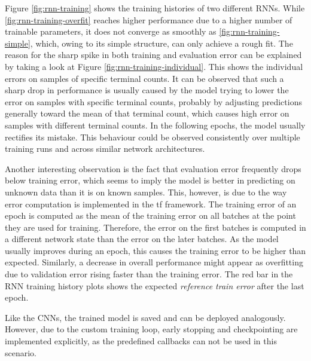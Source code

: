 Figure \ref{fig:rnn-training} shows the training histories of two different \glspl{RNN}. While \ref{fig:rnn-training-overfit} reaches higher performance due to a higher number of trainable parameters, it does not converge as smoothly as \ref{fig:rnn-training-simple}, which, owing to its simple structure, can only achieve a rough fit. The reason for the sharp spike in both training and evaluation error can be explained by taking a look at Figure \ref{fig:rnn-training-individual}. This shows the individual errors on samples of specific terminal counts. It can be observed that such a sharp drop in performance is usually caused by the model trying to lower the error on samples with specific terminal counts, probably by adjusting predictions generally toward the mean of that terminal count, which causes high error on samples with different terminal counts. In the following epochs, the model usually rectifies its mistake. This behaviour could be observed consistently over multiple training runs and across similar network architectures.

Another interesting observation is the fact that evaluation error frequently drops below training error, which seems to imply the model is better in predicting on unknown data than it is on known samples. This, however, is due to the way error computation is implemented in the \gls{tf} framework\cite{keras-faq-web}. The training error of an epoch is computed as the mean of the training error on all batches at the point they are used for training. Therefore, the error on the first batches is computed in a different network state than the error on the later batches. As the model usually improves during an epoch, this causes the training error to be higher than expected. Similarly, a decrease in overall performance might appear as overfitting due to validation error rising faster than the training error. The red bar in the \gls{RNN} training history plots shows the expected \textit{reference train error} after the last epoch.

Like the \glspl{CNN}, the trained model is saved and can be deployed analogously. However, due to the custom training loop, early stopping and checkpointing are implemented explicitly, as the predefined callbacks can not be used in this scenario.

